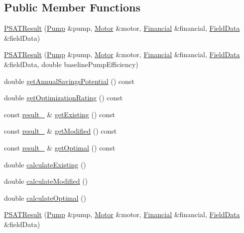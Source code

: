 \subsection*{Public Member Functions}
\begin{DoxyCompactItemize}
\item 
\hyperlink{class_p_s_a_t_result_af6f9d5dbd3a6aac3d7e5e212e3a40487}{P\+S\+A\+T\+Result} (\hyperlink{class_pump}{Pump} \&pump, \hyperlink{class_motor}{Motor} \&motor, \hyperlink{class_financial}{Financial} \&financial, \hyperlink{class_field_data}{Field\+Data} \&field\+Data)
\item 
\hyperlink{class_p_s_a_t_result_a89db10b4bcc52985fbb36e8c5afce2ab}{P\+S\+A\+T\+Result} (\hyperlink{class_pump}{Pump} \&pump, \hyperlink{class_motor}{Motor} \&motor, \hyperlink{class_financial}{Financial} \&financial, \hyperlink{class_field_data}{Field\+Data} \&field\+Data, double baseline\+Pump\+Efficiency)
\item 
double \hyperlink{class_p_s_a_t_result_a14fc75c2e0e92f74e3df1b97ed13b496}{get\+Annual\+Savings\+Potential} () const
\item 
double \hyperlink{class_p_s_a_t_result_aa0a7001461408fcb06a6c22ce2d064db}{get\+Optimization\+Rating} () const
\item 
const \hyperlink{struct_p_s_a_t_result_1_1result__}{result\+\_\+} \& \hyperlink{class_p_s_a_t_result_a4da660959f368bdf0951728c9c5f931b}{get\+Existing} () const
\item 
const \hyperlink{struct_p_s_a_t_result_1_1result__}{result\+\_\+} \& \hyperlink{class_p_s_a_t_result_ae43bb3b001e2746292d0dd0d6cebcfdd}{get\+Modified} () const
\item 
const \hyperlink{struct_p_s_a_t_result_1_1result__}{result\+\_\+} \& \hyperlink{class_p_s_a_t_result_af587235430371a05799c60e81aa8dfad}{get\+Optimal} () const
\item 
double \hyperlink{class_p_s_a_t_result_a594e019e535fb402d6d0441d50f8b697}{calculate\+Existing} ()
\item 
double \hyperlink{class_p_s_a_t_result_afbb68257a28c1b853d26faf3227461cc}{calculate\+Modified} ()
\item 
double \hyperlink{class_p_s_a_t_result_a25d50cd89b326f18449496a56d54f472}{calculate\+Optimal} ()
\item 
\hyperlink{class_p_s_a_t_result_af6f9d5dbd3a6aac3d7e5e212e3a40487}{P\+S\+A\+T\+Result} (\hyperlink{class_pump}{Pump} \&pump, \hyperlink{class_motor}{Motor} \&motor, \hyperlink{class_financial}{Financial} \&financial, \hyperlink{class_field_data}{Field\+Data} \&field\+Data)

\end{DoxyCompactItemize}
